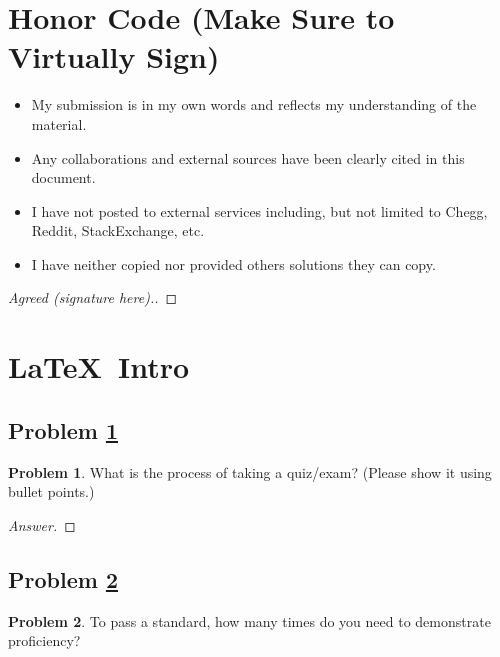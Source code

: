 \documentclass[11pt]{article}
\theoremstyle{definition}
\theoremstyle{definition}
\newtheorem{required}{Problem}
\theoremstyle{definition}
\begin{document}
\section{Honor Code (Make Sure to Virtually Sign)} \label{HonorCode}
    \begin{itemize}
        \item My submission is in my own words and reflects my understanding of the material.
        \item Any collaborations and external sources have been clearly cited in this document.
        \item I have not posted to external services including, but not limited to Chegg, Reddit, StackExchange, etc.
        \item I have neither copied nor provided others solutions they can copy.
    \end{itemize}

\begin{proof}[Agreed (signature here).]
\end{proof}


\newpage
\section{\LaTeX\ Intro}

\subsection{Problem \ref{Latex1}}
\begin{required} \label{Latex1}
    What is the process of taking a quiz/exam? (Please show it using bullet points.)
\end{required}

\begin{proof}[Answer]
\end{proof}



\newpage
\subsection{Problem \ref{Latex2}} 
\begin{required} \label{Latex2}
    To pass a standard, how many times do you need to demonstrate proficiency? 
\end{required}
\end{document}
